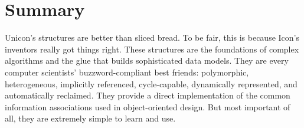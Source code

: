 \section{Summary}

Unicon's structures are better than sliced bread. To be fair, this is because
Icon's inventors really got things right. These structures are the foundations
of complex algorithms and the glue that builds sophisticated data models. They
are every computer scientists' buzzword-compliant best friends: polymorphic,
heterogeneous, implicitly referenced, cycle-capable, dynamically represented,
and automatically reclaimed.  They provide a direct implementation of the common
information associations used in object-oriented design. But most important of
all, they are extremely simple to learn and use.
